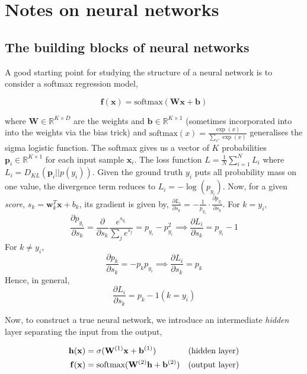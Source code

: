 
\chapter{Notes on neural networks} %

\label{AppendixA} %

\section{The building blocks of neural networks}

A good starting point for studying the structure of a neural network is to consider a softmax regression model,

$$\mathbf{f}(\mathbf{x}) = \text{softmax}(\mathbf{W}\mathbf{x} + \mathbf{b})$$

where $\mathbf{W} \in \mathbb{R}^{K \times D}$ are the weights and $\mathbf{b} \in \mathbb{R}^{K \times 1}$ (sometimes incorporated into into the weights via the bias trick) and $\text{softmax}(x) = \frac{\exp(x)}{\sum_{x'}\exp(x)}$ generalises the sigma logistic function. The softmax gives us a vector of $K$ probabilities $\mathbf{p}_i \in \mathbb{R}^{K \times 1}$ for each input sample $\mathbf{x}_i$. The loss function $L = \frac{1}{N}\sum_{i=1}^N L_i$ where $L_i = D_{KL}(\mathbf{p}_i || p(y_i))$. Given the ground truth $y_i$ puts all probability mass on one value, the divergence term reduces to $L_i = -\log(p_{y_i})$. Now, for a given \emph{score}, $s_k = \mathbf{w}_k^T\mathbf{x} + b_k$, its gradient is given by, $\frac{\partial L_i}{\partial s_k} = -\frac{1}{p_{y_i}}\cdot\frac{\partial p_{y_i}}{\partial s_k}$. For $k = y_{i}$, $$\frac{\partial p_{y_i}}{\partial s_k}
= \frac{\partial}{\partial s_k}\frac{e^{s_{y_i}}}{\sum_j e^{s_j}}
= p_{y_i} - p_{y_i}^2 \implies \frac{\partial L_i}{\partial s_k}
= p_{y_i} - 1$$
For $k \neq y_{i}$, $$\frac{\partial p_{k}}{\partial s_k}
= -p_kp_{y_i} \implies \frac{\partial L_i}{\partial s_k} = p_k$$
Hence, in general, $$\frac{\partial L_i}{\partial s_k}
= p_k - 1(k = y_i)$$

Now, to construct a true neural network, we introduce an intermediate \emph{hidden} layer separating the input from the output,

\begin{align}
\mathbf{h}(\mathbf{x}) &= \sigma(\mathbf{W}^{(1)}\mathbf{x}  + \mathbf{b}^{(1)}) & \text{(hidden layer)} \notag \\
\mathbf{f}(\mathbf{x}) &= \text{softmax}(\mathbf{W}^{(2)}\mathbf{h} + \mathbf{b}^{(2)}) & \text{(output layer)}\notag
\end{align}

